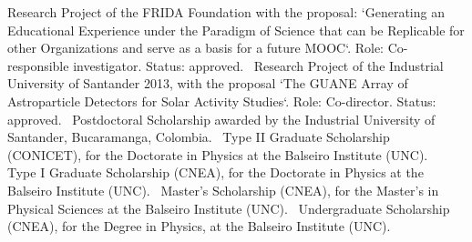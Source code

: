  Research Project of the FRIDA Foundation with the proposal: `Generating an Educational Experience under the Paradigm of Science that can be Replicable for other Organizations and serve as a basis for a future MOOC`. Role: Co-responsible investigator. Status: approved.\
 Research Project of the Industrial University of Santander 2013, with the proposal `The GUANE Array of Astroparticle Detectors for Solar Activity Studies`. Role: Co-director. Status: approved.\
 Postdoctoral Scholarship awarded by the Industrial University of Santander, Bucaramanga, Colombia.\
 Type II Graduate Scholarship (CONICET), for the Doctorate in Physics at the Balseiro Institute (UNC).\
 Type I Graduate Scholarship (CNEA), for the Doctorate in Physics at the Balseiro Institute (UNC).\
 Master's Scholarship (CNEA), for the Master's in Physical Sciences at the Balseiro Institute (UNC).\
 Undergraduate Scholarship (CNEA), for the Degree in Physics, at the Balseiro Institute (UNC).\
\fi
\else

